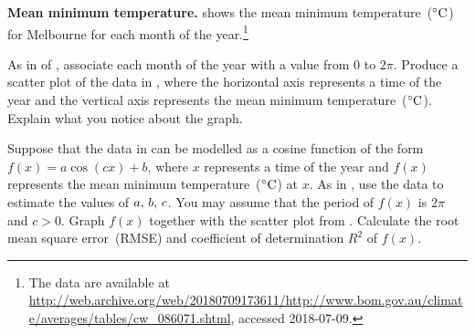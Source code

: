 \documentclass[a4paper,oneside,12pt]{article}
\begin{document}
\begin{table}[!htbp]
\centering

\caption{%
  The mean minimum temperature~($\degreec{}$) of each month for the
  city of Melbourne, Victoria, Australia.  The mean was calculated
  using temperature data for the years from $1855$ to $2015$.  The
  mean temperatures are provided by the Bureau of Meteorology of
  Australia.
}
\label{tab:trigonometry:mean_min_temperature}
\end{table}

\begin{exercise}
\textbf{Mean minimum temperature.}
 shows the mean minimum
temperature~($\degreec{}$) for Melbourne for each month of the
year.\footnote{
  The data are available at
  \url{http://web.archive.org/web/20180709173611/http://www.bom.gov.au/climate/averages/tables/cw_086071.shtml},
  accessed 2018-07-09.
}
\begin{packedenum}
\item\label{subex:trigonometric:mean_min_temperature_graph}
  As in  of
  , associate each
  month of the year with a value from $0$ to $2\pi$.  Produce a
  scatter plot of the data in
  , where the horizontal
  axis represents a time of the year and the vertical axis represents
  the mean minimum temperature~($\degreec{}$).  Explain what you
  notice about the graph.

\item\label{subex:trigonometric:mean_min_temperature_cos}
  Suppose that the data in
   can be modelled as a
  cosine function of the form $f(x) = a \cos(cx) + b$, where $x$
  represents a time of the year and $f(x)$ represents the mean minimum
  temperature~($\degreec{}$) at $x$.  As in
  , use the data to
  estimate the values of ${a},\, {b},\, {c}$.  You may assume that the
  period of $f(x)$ is $2\pi$ and $c > 0$.  Graph $f(x)$ together with
  the scatter plot
  from .
  Calculate the root mean square error~(RMSE) and coefficient of
  determination $R^2$ of $f(x)$.


\end{packedenum}
\end{exercise}
\end{document}
